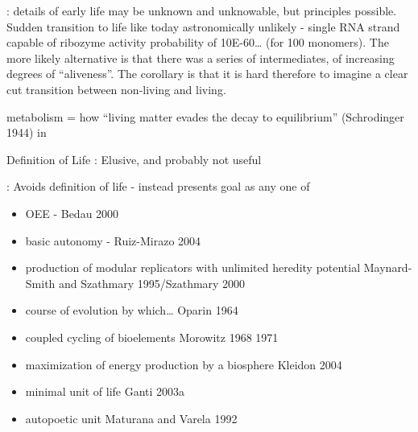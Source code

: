 \autocite{Pascal2013}: details of early life may be unknown and unknowable, but principles possible. Sudden transition to life like today astronomically unlikely - single RNA strand capable of ribozyme activity probability of 10E-60\ldots{} (for 100 monomers). The more likely alternative is that there was a series of intermediates, of increasing degrees of ``aliveness''. The corollary is that it is hard therefore to imagine a clear cut transition between non-living and living.

			metabolism = how ``living matter evades the decay to equilibrium''
			(Schrodinger 1944) in \autocite{Pascal2013}

			Definition of Life  \autocite{Pascal2013}: Elusive, and probably not useful
			
			
						\autocite{Fernando:2007pf}: Avoids definition of life - instead presents goal as any one of
						\begin{itemize}
							\item
							
							OEE - Bedau 2000
							
							\item
							
							basic autonomy - Ruiz-Mirazo 2004
							
							\item
							
							production of modular replicators with unlimited heredity potential
							Maynard-Smith and Szathmary 1995/Szathmary 2000
							
							\item
							
							course of evolution by which\ldots{} Oparin 1964
							
							\item
							
							coupled cycling of bioelements Morowitz 1968 1971
							
							\item
							
							maximization of energy production by a biosphere Kleidon 2004
							
							\item
							
							minimal unit of life Ganti 2003a
							
							\item
							
							autopoetic unit Maturana and Varela 1992	
						\end{itemize}
						
